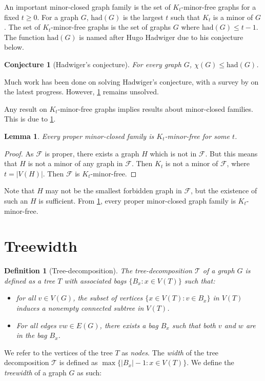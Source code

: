 \documentclass[]{article}
\newcommand{\tree}{\mathcal{T}}
\newcommand{\had}{\text{had}}
\newtheorem{lemma}[theorem]{Lemma}
\newtheorem{definition}[theorem]{Definition}
\newtheorem{conjecture}[theorem]{Conjecture}
\theoremstyle{definition}
\numberwithin{theorem}{section}
\numberwithin{equation}{section}
\begin{document}
An important minor-closed graph family is the set of \(K_t\)-minor-free graphs for a fixed $t \geq 0$. For a graph \(G\), \(\had(G)\) is the largest \(t\) such that \(K_t\) is a minor of \(G\). The set of $K_t$-minor-free graphs is the set of graphs $G$ where $\had(G) \leq t - 1$. The function $\had(G)$ is named after Hugo Hadwiger due to his conjecture below.
\begin{conjecture}[Hadwiger's conjecture]\label{conj:Hadwiger's Conjecture}
	For every graph \(G\), \(\chi(G) \leq \had(G)\).
\end{conjecture}
Much work has been done on solving Hadwiger's conjecture, with a survey by on the latest progress. However, \cref{conj:Hadwiger's Conjecture} remains unsolved.

 Any result on $K_t$-minor-free graphs implies results about minor-closed families. This is due to \cref{lem:minor-closed-Kt}. 

\begin{lemma}\label{lem:minor-closed-Kt}
    Every proper minor-closed family is $K_t$-minor-free for some $t$. 
\end{lemma}
\begin{proof}
    As $\mathcal{F}$ is proper, there exists a graph $H$ which is not in $\mathcal{F}$. But this means that $H$ is not a minor of any graph in $\mathcal{F}$. Then $K_t$ is not a minor of $\mathcal{F}$, where $t = |V(H)|$. Then $\mathcal{F}$ is $K_t$-minor-free. 
\end{proof}
Note that $H$ may not be the smallest forbidden graph in $\mathcal{F}$, but the existence of such an $H$ is sufficient. From \cref{lem:minor-closed-Kt}, every proper minor-closed graph family is $K_t$-minor-free.


\section{Treewidth}

\begin{definition}[Tree-decomposition]
	The tree-decomposition $\tree$ of a graph $G$ is defined as a tree $T$ with associated \textit{bags} $\lbrace B_x : x \in V(T) \rbrace$ such that:
	\begin{itemize}
		\item for all $v \in V(G)$, the subset of vertices $\lbrace x \in V(T): v \in B_x \rbrace$ in $V(T)$ induces a nonempty connected subtree in $V(T)$.
		\item For all edges $vw \in E(G)$, there exists a bag $B_x$ such that both $v$ and $w$ are in the bag $B_x$.
	\end{itemize}
\end{definition}
We refer to the vertices of the tree $T$ as \textit{nodes}. 
The \textit{width} of the tree decomposition $\tree$ is defined as $\max \lbrace |B_x| - 1 : x \in V(T) \rbrace$. We define the \textit{treewidth} of a graph $G$ as such:
\end{document}
